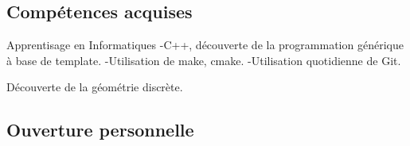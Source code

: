 \subsection{Compétences acquises}


Apprentisage en Informatiques
-C++, découverte de la programmation générique à base de template.
-Utilisation de make, cmake.
-Utilisation quotidienne de Git.

Découverte de la géométrie discrète.

\subsection{Ouverture personnelle}



